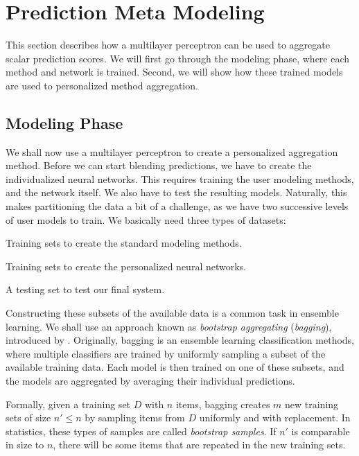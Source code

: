 \section{Prediction Meta Modeling}

This section describes how a multilayer perceptron can be used to aggregate scalar prediction scores.
We will first go through the modeling phase, where each method and network is trained.
Second, we will show how these trained models are used to personalized method aggregation.


\subsection{Modeling Phase}

We shall now use a multilayer perceptron to create a personalized aggregation method.
Before we can start blending predictions, we have to create the individualized neural networks.
This requires training the user modeling methods, and the network itself.
We also have to test the resulting models.
Naturally, this makes partitioning the data a bit of a challenge, as we have two successive levels of user models to train.
We basically need three types of datasets: 

\begin{enumerate*}
  \item Training sets to create the standard modeling methods.
  \item Training sets to create the personalized neural networks.
  \item A testing set to test our final system.
\end{enumerate*}

Constructing these subsets of the available data is a common task in ensemble learning.
We shall use an approach known as  \emph{bootstrap aggregating} (\emph{bagging}),
introduced by \cite{Breiman1996}.
Originally, bagging is an ensemble learning classification methods, where multiple classifiers are 
trained by uniformly sampling a subset of the available training data. 
Each model is then trained on one of these subsets, and the models are aggregated by averaging their individual predictions.

Formally, given a training set $D$ with $n$ items, bagging creates $m$ new training sets of size $n' \leq n$ by sampling
items from $D$ uniformly and with replacement. 
In statistics, these types of samples are called \emph{bootstrap samples}.
If $n'$ is comparable in size to $n$, there will be some items
that are repeated in the new training sets.

